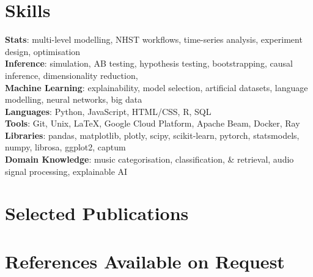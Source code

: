 \documentclass[letterpaper,11pt]{article}
\begin{document}
\section{Skills}
 \begin{itemize}[leftmargin=0.15in, label={}]
    \small{\item{
     \textbf{Stats}{: multi-level modelling, NHST workflows, time-series analysis, experiment design, optimisation} \\
     \textbf{Inference}{: simulation, AB testing, hypothesis testing, bootstrapping, causal inference, dimensionality reduction,} \\
     \textbf{Machine Learning}{: explainability, model selection, artificial datasets, language modelling, neural networks, big data} \\
     \textbf{Languages}{: Python, JavaScript, HTML/CSS, R, SQL} \\
     \textbf{Tools}{: Git, Unix, \LaTeX, Google Cloud Platform, Apache Beam, Docker, Ray} \\
     \textbf{Libraries}{: pandas, matplotlib, plotly, scipy, scikit-learn, pytorch, statsmodels, numpy, librosa, ggplot2, captum} \\
     \textbf{Domain Knowledge}{: music categorisation, classification, \& retrieval, audio signal processing, explainable AI}
    }}
 \end{itemize}


\section{Selected Publications}
\nocite{*}
  \resumeSubHeadingListStart
    \printbibliography[heading=none, keyword=paper]
    \printbibliography[heading=none, keyword=preprint]
    \printbibliography[heading=none, keyword=proceedings]
\resumeSubHeadingListEnd

\section{References Available on Request}
\end{document}
